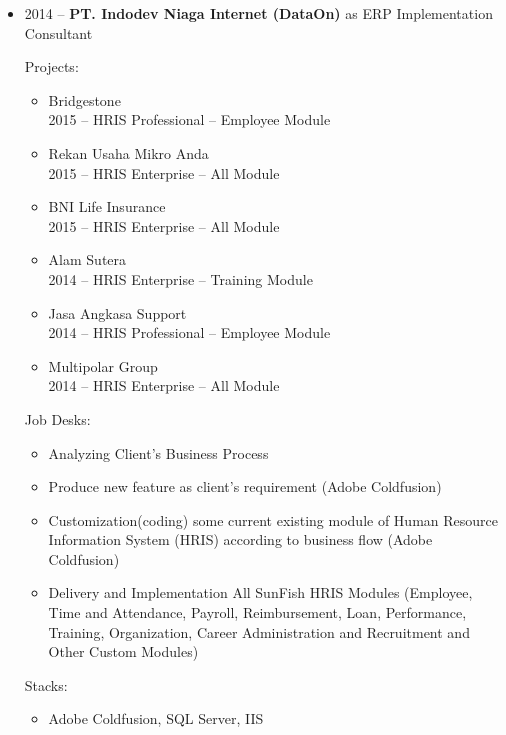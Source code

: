 \documentclass[11pt,a4paper,english]{article}
\begin{document}
\begin{itemize}
	\item 2014 -- \textbf{PT. Indodev Niaga Internet (DataOn)} as ERP Implementation Consultant
	\par \noindent Projects:
	\begin{itemize}
		\item Bridgestone\hfill \\2015 -- HRIS Professional -- Employee Module
		\item Rekan Usaha Mikro Anda\hfill \\2015 -- HRIS Enterprise -- All Module
		\item BNI Life Insurance\hfill \\2015 -- HRIS Enterprise -- All Module
		\item Alam Sutera\hfill \\2014 -- HRIS Enterprise -- Training Module
		\item Jasa Angkasa Support\hfill \\2014 -- HRIS Professional -- Employee Module
		\item Multipolar Group\hfill \\2014 -- HRIS Enterprise -- All Module	
	\end{itemize}
	\par Job Desks:
	\begin{itemize}
		\item Analyzing Client's Business Process
		\item Produce new feature as client's requirement (Adobe Coldfusion)
		\item Customization(coding) some current existing module of Human Resource Information System (HRIS) according to business flow (Adobe Coldfusion)
		\item Delivery and Implementation All SunFish HRIS Modules (Employee, Time and Attendance, Payroll, Reimbursement, Loan, Performance, Training, Organization, Career Administration and Recruitment and Other Custom Modules)
	\end{itemize}
	\par Stacks:
	\begin{itemize}
		\item Adobe Coldfusion, SQL Server, IIS
	\end{itemize}
\end{itemize}
\end{document}
